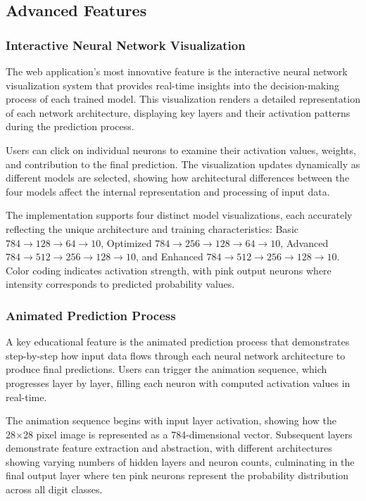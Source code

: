 \documentclass[11pt,a4paper]{report}
\begin{document}
\subsection{Advanced Features}

\subsubsection{Interactive Neural Network Visualization}

The web application's most innovative feature is the interactive neural network visualization system that provides real-time insights into the decision-making process of each trained model. This visualization renders a detailed representation of each network architecture, displaying key layers and their activation patterns during the prediction process.

Users can click on individual neurons to examine their activation values, weights, and contribution to the final prediction. The visualization updates dynamically as different models are selected, showing how architectural differences between the four models affect the internal representation and processing of input data.

The implementation supports four distinct model visualizations, each accurately reflecting the unique architecture and training characteristics: Basic $784 \rightarrow 128 \rightarrow 64 \rightarrow 10$, Optimized $784 \rightarrow 256 \rightarrow 128 \rightarrow 64 \rightarrow 10$, Advanced $784 \rightarrow 512 \rightarrow 256 \rightarrow 128 \rightarrow 10$, and Enhanced $784 \rightarrow 512 \rightarrow 256 \rightarrow 128 \rightarrow 10$. Color coding indicates activation strength, with pink output neurons where intensity corresponds to predicted probability values.

\subsubsection{Animated Prediction Process}

A key educational feature is the animated prediction process that demonstrates step-by-step how input data flows through each neural network architecture to produce final predictions. Users can trigger the animation sequence, which progresses layer by layer, filling each neuron with computed activation values in real-time.

The animation sequence begins with input layer activation, showing how the 28×28 pixel image is represented as a 784-dimensional vector. Subsequent layers demonstrate feature extraction and abstraction, with different architectures showing varying numbers of hidden layers and neuron counts, culminating in the final output layer where ten pink neurons represent the probability distribution across all digit classes.
\end{document}
